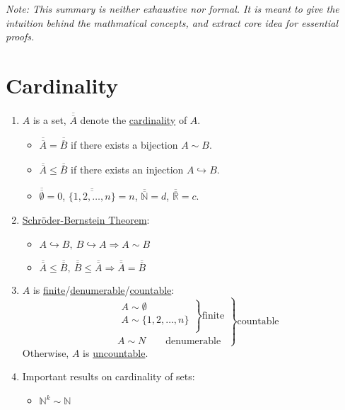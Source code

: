 \documentclass[%
 aip,
 jmp,%
 amsmath,amssymb,
 reprint,%
]{revtex4-1}
\def\R{{\mathbb R}}
\def\N{{\mathbb N}}
\newcommand{\imply}{\Rightarrow}
\newcommand{\defn}[1]{\underline{#1}}
\newcommand{\card}[1]{\overline{\overline{#1}}}
\newcommand{\inject}{\hookrightarrow}
\begin{document}
\emph{Note: This summary is neither exhaustive nor formal.
It is meant to give the intuition behind the mathmatical concepts, and
extract core idea for essential proofs.}

\section{Cardinality}
\begin{enumerate}
  \item $A$ is a set, $\card{A}$ denote the \defn{cardinality} of $A$.
      \begin{itemize}
        \item $\card{A} = \card{B}$ if there exists a bijection $A \sim B$.
        \item $\card{A} \le \card{B}$ if there exists an injection $A \inject B$.
        \item $\card{\emptyset}=0$, $\card{\{1,2,\dots,n\}}=n$, $\card{\N}=d$, $\card{\R}=c$.
      \end{itemize}

  \item \defn{Schr\"oder-Bernstein Theorem}:
    \begin{itemize}
      \item $A \inject B,\ B \inject A \imply A \sim B$
      \item $\card{A} \le \card{B},\ \card{B} \le \card{A} \imply \card{A} = \card{B}$
    \end{itemize}

  \item $A$ is \defn{finite}/\defn{denumerable}/\defn{countable}:
  \[
   \left.
      \begin{aligned}
         &\left.
          \begin{aligned}
             A \sim \emptyset \\
             A \sim \{ 1,2,\dots,n \}\\
          \end{aligned}
         \right\rbrace\text{finite}\\
          & A \sim N \qquad\textrm{denumerable}
      \end{aligned}
  \right\rbrace\text{countable}
  \]
  Otherwise, $A$ is \defn{uncountable}.

  \item Important results on cardinality of sets:
    \begin{itemize}
      \item $\N^k \sim \N$


\end{itemize}
\end{enumerate}
\end{document}
